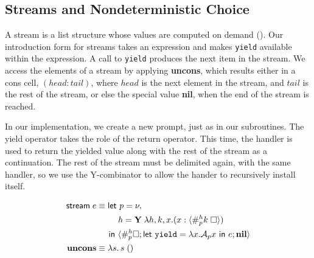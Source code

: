 \documentclass[11pt]{article}
\newcommand{\maybePage}{\null}
\newcommand\x{\lambda x}
\newcommand{\letin}[2]{\textsf{let }#1\textsf{ in }#2}
\newcommand\A{\mathcal{A}}
\newcommand{\angles}[1]{\langle#1\rangle}
\begin{document}
%
%

\maybePage
\subsection{Streams and Nondeterministic Choice}

A stream is a list structure whose values are computed on demand (\cite{SICP}).
Our introduction form for streams takes an expression and makes \texttt{yield} available within the expression.
A call to \texttt{yield} produces the next item in the stream.
We access the elements of a stream by applying \textbf{uncons}, which results either in a cons cell, $(head:tail)$, where $head$ is the next element in the stream, and $tail$ is the rest of the stream, or else the special value \textbf{nil}, when the end of the stream is reached.

In our implementation, we create a new prompt, just as in our subroutines.
The yield operator takes the role of the return operator.
This time, the handler is used to return the yielded value along with the rest of the stream as a continuation.
The rest of the stream must be delimited again, with the same handler, so we use the Y-combinator to allow the hander to recursively install itself.

\begin{align*}
\textsf{stream}\;e &\equiv{}
\textsf{let }p = \nu, \\
  &\qquad\;\; h = \textbf Y\;\lambda h,k,x.(x:\angles{\#_p^hk\;\square}) \\
  &\quad\;\,\textsf{in }
  \angles{\#_p^{h}\square; \letin{\texttt{yield}=\x.{\A_px}}{e}; \textbf{nil}} \\
\textbf{uncons} &\equiv \lambda s.\,s\;() \\
\end{align*}
\end{document}
